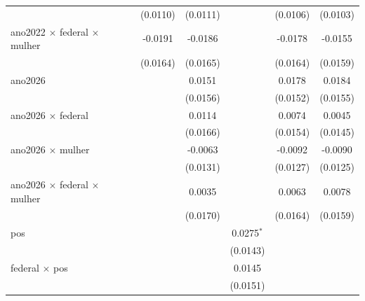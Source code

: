 \begin{tabular}{lccccc}
                                              & (0.0110)              & (0.0111)        &                 & (0.0106)           & (0.0103)\\   
   ano2022 $\times$ federal $\times$ mulher   & -0.0191               & -0.0186         &                 & -0.0178            & -0.0155\\   
                                              & (0.0164)              & (0.0165)        &                 & (0.0164)           & (0.0159)\\   
   ano2026                                    &                       & 0.0151          &                 & 0.0178             & 0.0184\\   
                                              &                       & (0.0156)        &                 & (0.0152)           & (0.0155)\\   
   ano2026 $\times$ federal                   &                       & 0.0114          &                 & 0.0074             & 0.0045\\   
                                              &                       & (0.0166)        &                 & (0.0154)           & (0.0145)\\   
   ano2026 $\times$ mulher                    &                       & -0.0063         &                 & -0.0092            & -0.0090\\   
                                              &                       & (0.0131)        &                 & (0.0127)           & (0.0125)\\   
   ano2026 $\times$ federal $\times$ mulher   &                       & 0.0035          &                 & 0.0063             & 0.0078\\   
                                              &                       & (0.0170)        &                 & (0.0164)           & (0.0159)\\   
   pos                                        &                       &                 & 0.0275$^{*}$    &                    &   \\   
                                              &                       &                 & (0.0143)        &                    &   \\   
   federal $\times$ pos                       &                       &                 & 0.0145          &                    &   \\   
                                              &                       &                 & (0.0151)        &                    &   \\   

\end{tabular}
